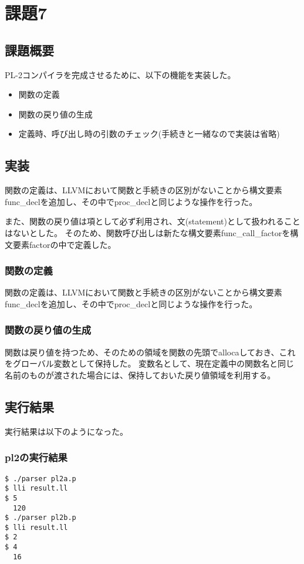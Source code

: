 \section{課題7}
\subsection{課題概要}
PL-2コンパイラを完成させるために、以下の機能を実装した。
\begin{itemize}
  \item 関数の定義
  \item 関数の戻り値の生成
  \item 定義時、呼び出し時の引数のチェック(手続きと一緒なので実装は省略)
\end{itemize}

\subsection{実装}
関数の定義は、LLVMにおいて関数と手続きの区別がないことから構文要素func\_declを追加し、その中でproc\_declと同じような操作を行った。

また、関数の戻り値は項として必ず利用され、文(statement)として扱われることはないとした。
そのため、関数呼び出しは新たな構文要素func\_call\_factorを構文要素factorの中で定義した。

\subsubsection{関数の定義}
関数の定義は、LLVMにおいて関数と手続きの区別がないことから構文要素func\_declを追加し、その中でproc\_declと同じような操作を行った。

\subsubsection{関数の戻り値の生成}
関数は戻り値を持つため、そのための領域を関数の先頭でallocaしておき、これをグローバル変数として保持した。
変数名として、現在定義中の関数名と同じ名前のものが渡された場合には、保持しておいた戻り値領域を利用する。

\subsection{実行結果}
実行結果は以下のようになった。

\subsubsection{pl2の実行結果}
\begin{lstlisting}[caption={pl2a.p, pl2b.pの実行結果 },label={pl2a.p, pl2b.pの実行結果}]
$ ./parser pl2a.p
$ lli result.ll
$ 5
  120
$ ./parser pl2b.p
$ lli result.ll
$ 2 
$ 4
  16
\end{lstlisting}

